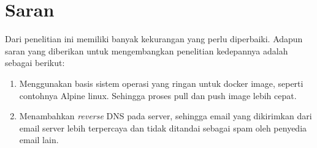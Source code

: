 \documentclass[./bab_5.tex]{subfiles}
\begin{document}
\section{Saran}
Dari penelitian ini memiliki banyak kekurangan yang perlu
diperbaiki. Adapun saran yang diberikan untuk mengembangkan
penelitian kedepannya adalah sebagai berikut:
\begin{enumerate}
  \item Menggunakan basis sistem operasi yang ringan untuk
  docker image, seperti contohnya Alpine linux. Sehingga
  proses pull dan push image lebih cepat.

  \item Menambahkan \textit{reverse} DNS pada server,
  sehingga email yang dikirimkan dari email server lebih
  terpercaya dan tidak ditandai sebagai spam oleh penyedia email lain.
\end{enumerate}
\end{document}
